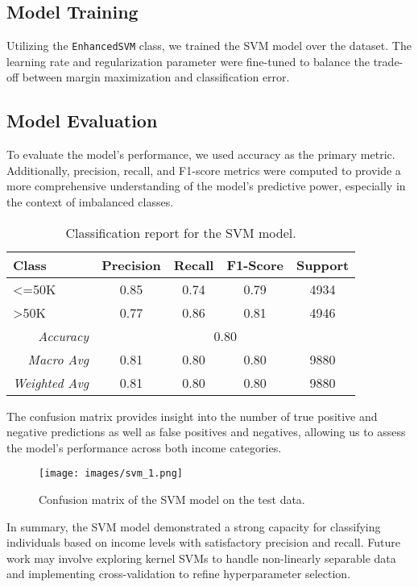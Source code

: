 \documentclass[12pt]{article}
\begin{document}
\subsection{Model Training}
Utilizing the \texttt{EnhancedSVM} class, we trained the SVM model over the dataset. The learning rate and regularization parameter were fine-tuned to balance the trade-off between margin maximization and classification error.

\subsection{Model Evaluation}
To evaluate the model's performance, we used accuracy as the primary metric. Additionally, precision, recall, and F1-score metrics were computed to provide a more comprehensive understanding of the model's predictive power, especially in the context of imbalanced classes.

\begin{table}[H]
\centering
\begin{tabular}{|l|c|c|c|c|}
\hline
\textbf{Class} & \textbf{Precision} & \textbf{Recall} & \textbf{F1-Score} & \textbf{Support} \\
\hline
<=50K & 0.85 & 0.74 & 0.79 & 4934 \\
>50K & 0.77 & 0.86 & 0.81 & 4946 \\
\hline
\multicolumn{1}{|r|}{\textit{Accuracy}} & \multicolumn{4}{c|}{0.80} \\
\multicolumn{1}{|r|}{\textit{Macro Avg}} & 0.81 & 0.80 & 0.80 & 9880 \\
\multicolumn{1}{|r|}{\textit{Weighted Avg}} & 0.81 & 0.80 & 0.80 & 9880 \\
\hline
\end{tabular}
\caption{Classification report for the SVM model.}
\label{tab:svm_classification_report}
\end{table}

The confusion matrix provides insight into the number of true positive and negative predictions as well as false positives and negatives, allowing us to assess the model's performance across both income categories.

\begin{figure}[H]
\centering
\texttt{[image: images/svm\_1.png]}
\caption{Confusion matrix of the SVM model on the test data.}
\label{fig:svm_confusion_matrix}
\end{figure}

In summary, the SVM model demonstrated a strong capacity for classifying individuals based on income levels with satisfactory precision and recall. Future work may involve exploring kernel SVMs to handle non-linearly separable data and implementing cross-validation to refine hyperparameter selection.
\end{document}
